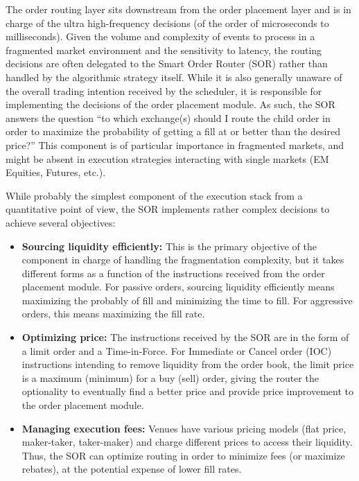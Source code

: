 The order routing layer sits downstream from the order placement layer and is in charge of the ultra high-frequency decisions (of the order of microseconds to milliseconds). Given the volume and complexity of events to process in a fragmented market environment and the sensitivity to latency, the routing decisions are often delegated to the Smart Order Router (SOR) rather than handled by the algorithmic strategy itself. While it is also generally unaware of the overall trading intention received by the scheduler, it is responsible for implementing the decisions of the order placement module. As such, the SOR answers the question ``to which exchange(s) should I route the child order in order to maximize the probability of getting a fill at or better than the desired price?'' This component is of particular importance in fragmented markets, and might be absent in execution strategies interacting with single markets (EM Equities, Futures, etc.). 


While probably the simplest component of the execution stack from a quantitative point of view, the SOR implements rather complex decisions to achieve several objectives: 

\begin{itemize}
\item \textbf{Sourcing liquidity efficiently:} This is the primary objective of the component in charge of handling the fragmentation complexity, but it takes different forms as a function of the instructions received from the order placement module. For passive orders, sourcing liquidity efficiently means maximizing the probably of fill and minimizing the time to fill. For aggressive orders, this means maximizing the fill rate.

\item \textbf{Optimizing price:} The instructions received by the SOR are in the form of a limit order and a Time-in-Force. For Immediate or Cancel order (IOC) instructions intending to remove liquidity from the order book, the limit price is a maximum (minimum) for a buy (sell) order, giving the router the optionality to eventually find a better price and provide price improvement to the order placement module.

\item \textbf{Managing execution fees:} Venues have various pricing models (flat price, maker-taker, taker-maker) and charge different prices to access their liquidity. Thus, the SOR can optimize routing in order to minimize fees (or maximize rebates), at the potential expense of lower fill rates.
\end{itemize}


